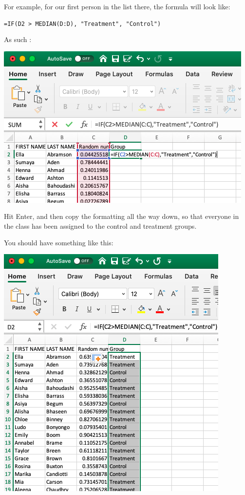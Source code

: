 \documentclass[
]{book}
\begin{document}
For example, for our first person in the list there, the formula will look like:

\texttt{=IF(D2\ \textgreater{}\ MEDIAN(D:D),\ "Treatment",\ "Control")}

As such :

\includegraphics{imgs/first_rand_assig.png}

Hit Enter, and then copy the formatting all the way down, so that everyone in the class has been assigned to the control and treatment groups.

You should have something like this:

\includegraphics{imgs/students_assigned.png}
\end{document}
